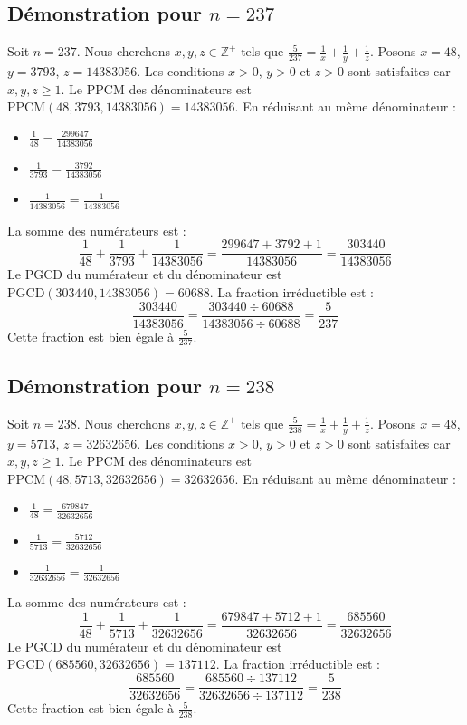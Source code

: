 \documentclass[11pt,a4paper]{article}
\begin{document}
\subsection{Démonstration pour $n = 237$}
Soit $n = 237$. Nous cherchons $x, y, z \in \mathbb{Z}^{+}$ tels que $\frac{5}{237} = \frac{1}{x} + \frac{1}{y} + \frac{1}{z}$.
Posons $x = 48$, $y = 3793$, $z = 14383056$.
Les conditions $x > 0$, $y > 0$ et $z > 0$ sont satisfaites car $x, y, z \geq 1$.
Le PPCM des dénominateurs est $\text{PPCM}(48, 3793, 14383056) = 14383056$.
En réduisant au même dénominateur :
\begin{itemize}
    \item $\frac{1}{48} = \frac{299647}{14383056}$
    \item $\frac{1}{3793} = \frac{3792}{14383056}$
    \item $\frac{1}{14383056} = \frac{1}{14383056}$
\end{itemize}
La somme des numérateurs est :
$$ \frac{1}{48} + \frac{1}{3793} + \frac{1}{14383056} = \frac{299647 + 3792 + 1}{14383056} = \frac{303440}{14383056} $$
Le PGCD du numérateur et du dénominateur est $\text{PGCD}(303440, 14383056) = 60688$.
La fraction irréductible est :
$$ \frac{303440}{14383056} = \frac{303440 \div 60688}{14383056 \div 60688} = \frac{5}{237} $$
Cette fraction est bien égale à $\frac{5}{237}$.

\subsection{Démonstration pour $n = 238$}
Soit $n = 238$. Nous cherchons $x, y, z \in \mathbb{Z}^{+}$ tels que $\frac{5}{238} = \frac{1}{x} + \frac{1}{y} + \frac{1}{z}$.
Posons $x = 48$, $y = 5713$, $z = 32632656$.
Les conditions $x > 0$, $y > 0$ et $z > 0$ sont satisfaites car $x, y, z \geq 1$.
Le PPCM des dénominateurs est $\text{PPCM}(48, 5713, 32632656) = 32632656$.
En réduisant au même dénominateur :
\begin{itemize}
    \item $\frac{1}{48} = \frac{679847}{32632656}$
    \item $\frac{1}{5713} = \frac{5712}{32632656}$
    \item $\frac{1}{32632656} = \frac{1}{32632656}$
\end{itemize}
La somme des numérateurs est :
$$ \frac{1}{48} + \frac{1}{5713} + \frac{1}{32632656} = \frac{679847 + 5712 + 1}{32632656} = \frac{685560}{32632656} $$
Le PGCD du numérateur et du dénominateur est $\text{PGCD}(685560, 32632656) = 137112$.
La fraction irréductible est :
$$ \frac{685560}{32632656} = \frac{685560 \div 137112}{32632656 \div 137112} = \frac{5}{238} $$
Cette fraction est bien égale à $\frac{5}{238}$.
\end{document}
